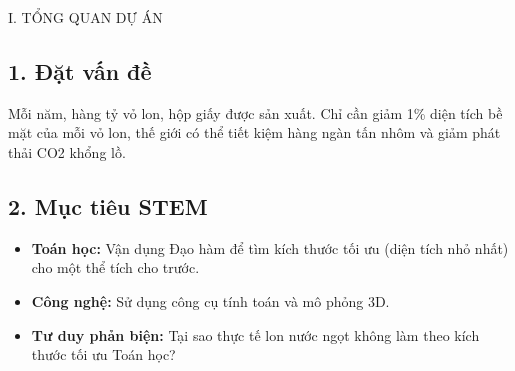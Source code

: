 \documentclass[12pt,a4paper]{article}
\begin{document}
\begin{sectionbox}{I. TỔNG QUAN DỰ ÁN}
\subsection*{1. Đặt vấn đề}
Mỗi năm, hàng tỷ vỏ lon, hộp giấy được sản xuất. Chỉ cần giảm 1\% diện tích bề mặt của mỗi vỏ lon, thế giới có thể tiết kiệm hàng ngàn tấn nhôm và giảm phát thải CO2 khổng lồ.

\subsection*{2. Mục tiêu STEM}
\begin{itemize}
    \item \textbf{Toán học:} Vận dụng Đạo hàm để tìm kích thước tối ưu (diện tích nhỏ nhất) cho một thể tích cho trước.
    \item \textbf{Công nghệ:} Sử dụng công cụ tính toán và mô phỏng 3D.
    \item \textbf{Tư duy phản biện:} Tại sao thực tế lon nước ngọt không làm theo kích thước tối ưu Toán học?
\end{itemize}
\end{sectionbox}
\end{document}
